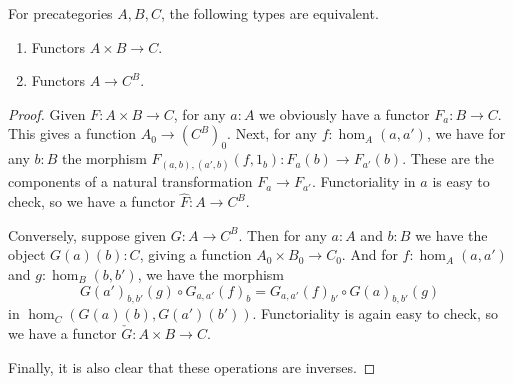 \documentclass[10pt,a4paper]{article}
\theoremstyle{definition}
\theoremstyle{remark}
\numberwithin{equation}{section}
\begin{document}
\begin{lem}\label{ct:functorexpadj}
  For precategories $A,B,C$, the following types are equivalent.
  \begin{enumerate}
  \item Functors $A\times B\to C$.
  \item Functors $A\to C^B$.
  \end{enumerate}
\end{lem}

\begin{proof}
  Given $F:A\times B\to C$, for any $a:A$ we obviously have a functor $F_a : B\to C$.
  This gives a function $A_0 \to (C^B)_0$.
  Next, for any $f:\hom_A(a,a')$, we have for any $b:B$ the morphism $F_{(a,b),(a',b)}(f,1_b):F_a(b) \to F_{a'}(b)$.
  These are the components of a natural transformation $F_a \to F_{a'}$.
  Functoriality in $a$ is easy to check, so we have a functor $\hat{F}:A\to C^B$.

  Conversely, suppose given $G:A\to C^B$.
  Then for any $a:A$ and $b:B$ we have the object $G(a)(b):C$, giving a function $A_0 \times B_0 \to C_0$.
  And for $f:\hom_A(a,a')$ and $g:\hom_B(b,b')$, we have the morphism
  \begin{equation*}
     G(a')_{b,b'}(g)\circ G_{a,a'}(f)_b = G_{a,a'}(f)_{b'} \circ  G(a)_{b,b'}(g)
  \end{equation*}
  in $\hom_C(G(a)(b), G(a')(b'))$.
  Functoriality is again easy to check, so we have a functor $\check{G}:A\times B \to C$.

  Finally, it is also clear that these operations are inverses.
\end{proof}
\end{document}
